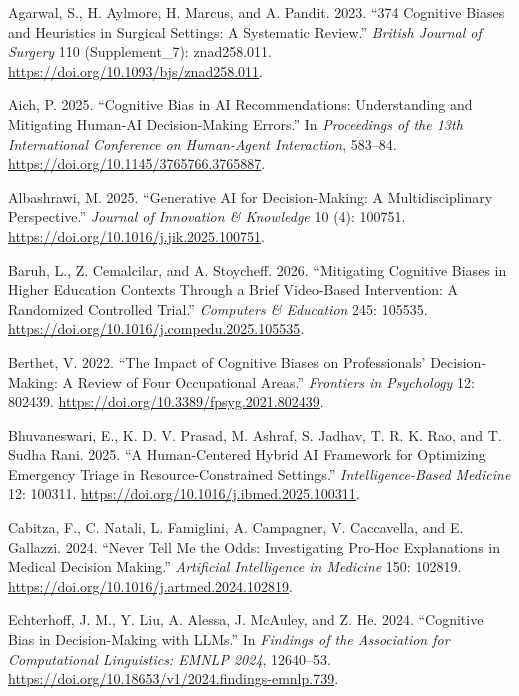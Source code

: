 \documentclass[
  manuscript,
  anonymous,
  review]{acmart}
\newlength{\cslhangindent}
\newenvironment{CSLReferences}[2] %
 {\begin{list}{}{%
  \setlength{\itemindent}{0pt}
  \setlength{\leftmargin}{0pt}
  \setlength{\parsep}{0pt}
  \ifodd #1
   \setlength{\leftmargin}{\cslhangindent}
   \setlength{\itemindent}{-1\cslhangindent}
  \fi
  \setlength{\itemsep}{#2\baselineskip}}}
 {\end{list}}
\begin{document}
\label{refs}
\begin{CSLReferences}{1}{0}
Agarwal, S., H. Aylmore, H. Marcus, and A. Pandit. 2023. {``374
Cognitive Biases and Heuristics in Surgical Settings: {A} Systematic
Review.''} \emph{British Journal of Surgery} 110 (Supplement\_7):
znad258.011. \url{https://doi.org/10.1093/bjs/znad258.011}.

Aich, P. 2025. {``Cognitive Bias in {AI} Recommendations:
{Understanding} and Mitigating Human-{AI} Decision-Making Errors.''} In
\emph{Proceedings of the 13th International Conference on Human-Agent
Interaction}, 583--84. \url{https://doi.org/10.1145/3765766.3765887}.

Albashrawi, M. 2025. {``Generative {AI} for Decision-Making: {A}
Multidisciplinary Perspective.''} \emph{Journal of Innovation \&
Knowledge} 10 (4): 100751.
\url{https://doi.org/10.1016/j.jik.2025.100751}.

Baruh, L., Z. Cemalcilar, and A. Stoycheff. 2026. {``Mitigating
Cognitive Biases in Higher Education Contexts Through a Brief
Video-Based Intervention: {A} Randomized Controlled Trial.''}
\emph{Computers \& Education} 245: 105535.
\url{https://doi.org/10.1016/j.compedu.2025.105535}.

Berthet, V. 2022. {``The Impact of Cognitive Biases on Professionals'
Decision-Making: {A} Review of Four Occupational Areas.''}
\emph{Frontiers in Psychology} 12: 802439.
\url{https://doi.org/10.3389/fpsyg.2021.802439}.

Bhuvaneswari, E., K. D. V. Prasad, M. Ashraf, S. Jadhav, T. R. K. Rao,
and T. Sudha Rani. 2025. {``A Human-Centered Hybrid {AI} Framework for
Optimizing Emergency Triage in Resource-Constrained Settings.''}
\emph{Intelligence-Based Medicine} 12: 100311.
\url{https://doi.org/10.1016/j.ibmed.2025.100311}.

Cabitza, F., C. Natali, L. Famiglini, A. Campagner, V. Caccavella, and
E. Gallazzi. 2024. {``Never Tell Me the Odds: {Investigating} Pro-Hoc
Explanations in Medical Decision Making.''} \emph{Artificial
Intelligence in Medicine} 150: 102819.
\url{https://doi.org/10.1016/j.artmed.2024.102819}.

Echterhoff, J. M., Y. Liu, A. Alessa, J. McAuley, and Z. He. 2024.
{``Cognitive Bias in Decision-Making with {LLMs}.''} In \emph{Findings
of the Association for Computational Linguistics: {EMNLP} 2024},
12640--53. \url{https://doi.org/10.18653/v1/2024.findings-emnlp.739}.


\end{CSLReferences}
\end{document}

